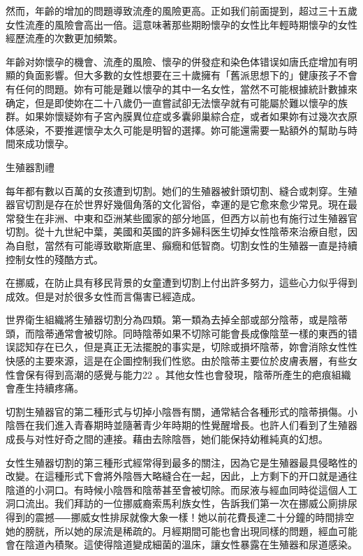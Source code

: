 \documentclass[12pt,UTF8]{ctexbook}
\begin{document}
然而，年齡的增加的問題導致流產的風險更高。正如我们前面提到，超过三十五歲女性流產的風險會高出一倍。這意味著那些期盼懷孕的女性比年輕時期懷孕的女性經歷流產的次數更加頻繁。

年齡对妳懷孕的機會、流產的風險、懷孕的併發症和染色体错误如唐氏症增加有明顯的負面影響。但大多數的女性想要在三十歲擁有「舊派思想下的」健康孩子不會有任何的問題。妳有可能是難以懷孕的其中一名女性，當然不可能根據統計數據來确定，但是即使妳在二十八歲仍一直嘗試卻无法懷孕就有可能屬於難以懷孕的族群。如果妳懷疑妳有子宮內膜異位症或多囊卵巢綜合症，或者如果妳有过幾次衣原体感染，不要推遲懷孕太久可能是明智的選擇。妳可能還需要一點額外的幫助与時間來成功懷孕。





生殖器割禮




每年都有數以百萬的女孩遭到切割。她们的生殖器被針頭切割、縫合或刺穿。生殖器官切割是存在於世界好幾個角落的文化習俗，幸運的是它愈來愈少常見。現在最常發生在非洲、中東和亞洲某些國家的部分地區，但西方以前也有施行过生殖器官切割。從十九世紀中葉，美國和英國的許多婦科医生切掉女性陰蒂來治療自慰，因為自慰，當然有可能導致歇斯底里、癲癇和低智商。切割女性的生殖器一直是持續控制女性的殘酷方式。

在挪威，在防止具有移民背景的女童遭到切割上付出許多努力，這些心力似乎得到成效。但是对於很多女性而言傷害已經造成。

世界衛生組織將生殖器切割分為四類。第一類為去掉全部或部分陰蒂，或是陰蒂頭，而陰蒂通常會被切除。同時陰蒂如果不切除可能會長成像陰莖一樣的東西的错误認知存在已久，但是真正无法擺脫的事实是，切除或損坏陰蒂，妳會消除女性性快感的主要來源，這是在企圖控制我们性慾。由於陰蒂主要位於皮膚表層，有些女性會保有得到高潮的感覺与能力22 。其他女性也會發現，陰蒂所產生的疤痕組織會產生持續疼痛。

切割生殖器官的第二種形式与切掉小陰唇有關，通常結合各種形式的陰蒂損傷。小陰唇在我们進入青春期時並隨著青少年時期的性覺醒增長。也許人们看到了生殖器成長与对性好奇之間的連接。藉由去除陰唇，她们能保持幼稚純真的幻想。

女性生殖器切割的第三種形式經常得到最多的關注，因為它是生殖器最具侵略性的改變。在這種形式下會將外陰唇大略縫合在一起，因此，上方剩下的开口就是通往陰道的小洞口。有時候小陰唇和陰蒂甚至會被切除。而尿液与經血同時從這個人工洞口流出。我们拜訪的一位挪威裔索馬利族女性，告訴我们第一次在挪威公廁排尿得到的震撼⸺挪威女性排尿就像大象一樣！她以前花費長達二十分鐘的時間排空她的膀胱，所以她的尿流是稀疏的。月經期間可能也會出現同樣的問題，經血可能會在陰道內積聚。這使得陰道變成細菌的溫床，讓女性暴露在生殖器和尿道感染。
\end{document}

